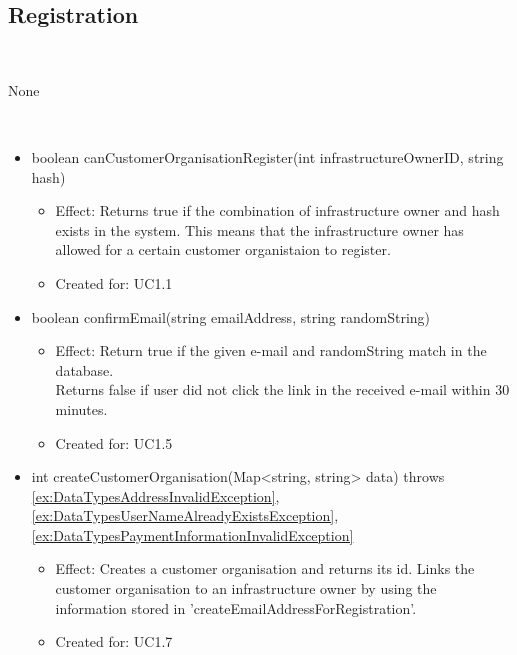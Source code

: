   \subsection{Registration}\label{int:OnlineServiceOnlineServiceUnregisteredUserFacadeRegistration}
    \begin{description}
      \item[Provided by:] \iconcomponent{}~
      \item[Required by:] None
      \item[Operations:] ~
    \begin{itemize}[noitemsep,nolistsep,leftmargin=-.25cm]
      \item \textsf{boolean canCustomerOrganisationRegister(int infrastructureOwnerID, string hash)}
        \begin{itemize}[noitemsep,nolistsep]
           \item Effect: Returns true if the combination of infrastructure owner and hash exists in the system. This means that the infrastructure owner has allowed for a certain customer organistaion to register.
\item Created for: UC1.1
        \end{itemize}
      \item \textsf{boolean confirmEmail(string emailAddress, string randomString)}
        \begin{itemize}[noitemsep,nolistsep]
           \item Effect: Return true if the given e-mail and randomString match in the database. \\
Returns false if user did not click the link in the received e-mail within 30 minutes.
\item Created for: UC1.5
        \end{itemize}
      \item \textsf{int createCustomerOrganisation(Map\textless{}string, string\textgreater{} data) throws \ref{ex:DataTypesAddressInvalidException}, \ref{ex:DataTypesUserNameAlreadyExistsException}, \ref{ex:DataTypesPaymentInformationInvalidException}}
        \begin{itemize}[noitemsep,nolistsep]
           \item Effect: Creates a customer organisation and returns its id. Links the customer organisation to an infrastructure owner by using the information stored in 'createEmailAddressForRegistration'.
\item Created for: UC1.7

\end{itemize}
\end{itemize}
\end{description}
